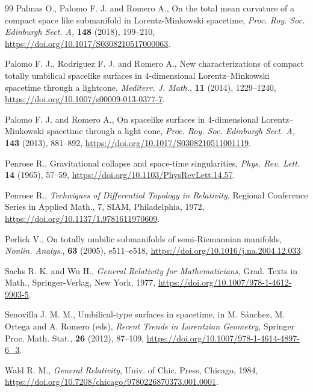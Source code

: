 \documentclass[11pt]{article}
\numberwithin{equation}{section}
\begin{document}
\begin{thebibliography}{99}
		Palmas O., Palomo F. J.  and Romero A., On the total mean curvature of a compact space like submanifold in Lorentz-Minkowski spacetime, \emph{Proc. Roy. Soc. Edinburgh Sect. A,} \textbf{148} (2018), 199--210, \url{https://doi.org/10.1017/S0308210517000063}.
		
		
		Palomo F. J., Rodriguez F. J. and Romero A., New characterizations of compact totally umbilical spacelike surfaces in 4-dimensional Lorentz--Minkowski spacetime through a lightcone, \emph{Mediterr. J. Math.}, \textbf{11} (2014), 1229--1240, \url{https://doi.org/10.1007/s00009-013-0377-7}.
		
		
		Palomo F. J. and Romero A., On spacelike surfaces in 4-dimensional Lorentz--Minkowski spacetime through a light cone, \emph{Proc. Roy. Soc. Edinburgh Sect. A,} \textbf{143} (2013), 881--892, \url{https://doi.org/10.1017/S0308210511001119}.
		
		Penrose R.,  Gravitational collapse and space-time singularities,  \emph{Phys. Rev. Lett.} \textbf{14} (1965), 57--59, \url{https://doi.org/10.1103/PhysRevLett.14.57}.
		
		Penrose R.,
		\newblock \emph{Techniques of Differential Topology in Relativity},
		\newblock Regional Conference Series in Applied Math., 7, SIAM, Philadelphia, 1972, \url{https://doi.org/10.1137/1.9781611970609}.
		
		Perlick V., On totally umbilic submanifolds of semi-Riemannian manifolds,
		\emph{Nonlin. Analys.}, \textbf{63} (2005), e511--e518, \url{https://doi.org/10.1016/j.na.2004.12.033}.
		
		Sachs R. K. and Wu  H., \emph{General Relativity for Mathematicians,} Grad. Texts in Math., Springer-Verlag, New York, 1977, \url{https://doi.org/10.1007/978-1-4612-9903-5}.
		
		Senovilla J. M. M., Umbilical-type surfaces in spacetime, in M. Sánchez, M. Ortega and A. Romero (eds), \emph{Recent Trends in Lorentzian Geometry}, Springer Proc. Math. Stat., \textbf{26} (2012), 87--109, \url{https://doi.org/10.1007/978-1-4614-4897-6_3}.
		
		Wald R. M.,   \emph{General Relativity}, Univ. of Chic. Press, Chicago, 1984, \url{https://doi.org/10.7208/chicago/9780226870373.001.0001}.
		
	\end{thebibliography}
	
	
\end{document}
